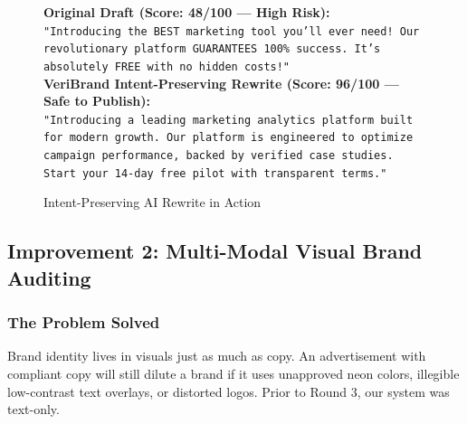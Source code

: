 \documentclass[11pt,a4paper]{article}
\begin{document}
\begin{figure}[H]
\centering
\begin{tcolorbox}[colback=white, colframe=primaryblue, title=\textbf{Sample Rewrite Transformation}]
\textbf{Original Draft (Score: 48/100 --- High Risk):}\\
\textcolor{dangerred}{\texttt{"Introducing the BEST marketing tool you'll ever need! Our revolutionary platform GUARANTEES 100\% success. It's absolutely FREE with no hidden costs!"}}\\
\vspace{0.2cm}
\textbf{VeriBrand Intent-Preserving Rewrite (Score: 96/100 --- Safe to Publish):}\\
\textcolor{successgreen}{\texttt{"Introducing a leading marketing analytics platform built for modern growth. Our platform is engineered to optimize campaign performance, backed by verified case studies. Start your 14-day free pilot with transparent terms."}}
\end{tcolorbox}
\caption{Intent-Preserving AI Rewrite in Action}
\end{figure}

\newpage

\subsection{Improvement 2: Multi-Modal Visual Brand Auditing}

\subsubsection{The Problem Solved}
Brand identity lives in visuals just as much as copy. An advertisement with compliant copy will still dilute a brand if it uses unapproved neon colors, illegible low-contrast text overlays, or distorted logos. Prior to Round 3, our system was text-only.
\end{document}
